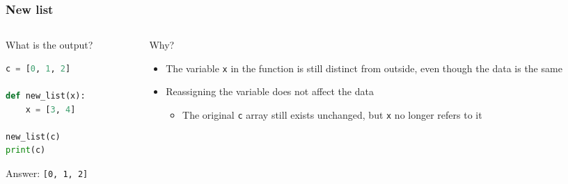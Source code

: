 \documentclass[aspectratio=169,hyperref={bookmarks=false,urlcolor=blue,colorlinks=true},10pt]{beamer}
\begin{document}
\begin{frame}[fragile]
  \frametitle{New list}

  \begin{columns}[t]
    \begin{column}{0.45\textwidth}
      What is the output?

      \begin{lstlisting}[language=Python]
c = [0, 1, 2]

def new_list(x):
    x = [3, 4]

new_list(c)
print(c)
      \end{lstlisting}

      \pause

      Answer: \texttt{[0, 1, 2]}
    \end{column}
    \begin{column}{0.45\textwidth}
      Why?

      \pause

      \begin{itemize}
      \item The variable \texttt{x} in the function is still distinct from outside, even though the
        data is the same
      \item Reassigning the variable does not affect the data
        \begin{itemize}
        \item The original \texttt{c} array still exists unchanged, but \texttt{x} no longer refers
          to it
        \end{itemize}
      \end{itemize}
    \end{column}
  \end{columns}
\end{frame}
\end{document}
